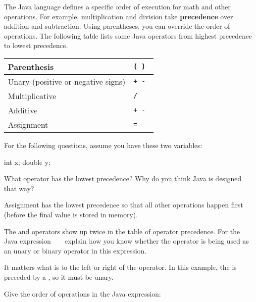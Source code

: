 

The Java language defines a specific order of execution for math and other operations. For example, multiplication and division take \textbf{precedence} over addition and subtraction. Using parentheses, you can override the order of operations.
The following table lists some Java operators from highest precedence to lowest precedence.

\begin{center}
\begin{tabular}{|L{3in}|L{1in}|}
\hline
Parenthesis
& \tt ( ) \\
\hline
Unary (positive or negative signs)
& \tt + - \\
\hline
Multiplicative
& \tt * / \\
\hline
Additive
& \tt + - \\
\hline
Assignment
& \tt = \\
\hline
\end{tabular}
\end{center}

For the following questions, assume you have these two variables:

\begin{javalst}
    int x;
    double y;
\end{javalst}




\Q What operator has the lowest precedence?
Why do you think Java is designed that way?

\begin{answer}
Assignment has the lowest precedence so that all other operations happen first (before the final value is stored in memory).
\end{answer}


\Q The \java{+} and \java{-} operators show up twice in the table of operator precedence.
For the Java expression ~  ~ explain how you know whether the \java{-} operator is being used as an unary or binary operator in this expression.

\begin{answer}
It matters what is to the left or right of the operator.
In this example, the \java{-} is preceded by a \java{*}, so it must be unary.
\end{answer}


\Q Give the order of operations in the Java expression: ~ 

